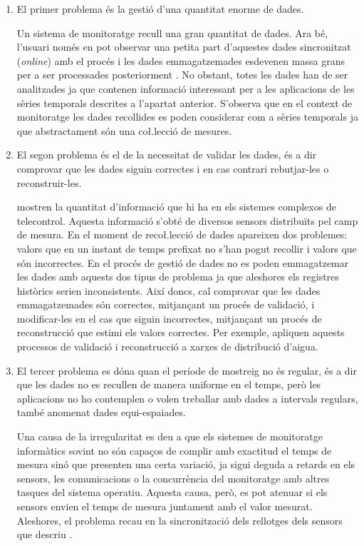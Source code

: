 \begin{enumerate}
\item El primer problema és la gestió d'una quantitat enorme de dades. 

Un sistema de monitoratge recull una gran quantitat de dades. Ara bé, l'usuari només en pot observar una petita part d'aquestes dades sincronitzat (\emph{online}) amb el procés i les dades emmagatzemades esdevenen massa grans per a ser processades posteriorment \parencite{keogh97}. No obstant, totes les dades han de ser analitzades ja que contenen informació interessant per a les aplicacions de les sèries temporals descrites a l'apartat anterior. S'observa que en el context de monitoratge les dades recollides es poden considerar com a sèries temporals ja que abstractament són una co\l.lecció de mesures.


\item El segon problema és el de la necessitat de validar les dades, és a dir comprovar que les dades siguin correctes i en cas contrari rebutjar-les o reconstruir-les. 

\textcite{quevedo10} mostren la quantitat d'informació que hi ha en els sistemes complexos de telecontrol. Aquesta informació s'obté de diversos sensors distribuïts pel camp de mesura.
En el moment de reco\l.lecció de dades apareixen dos problemes: valors que en un instant de temps prefixat no s'han pogut recollir i valors que són incorrectes. En el procés de gestió de dades no es poden emmagatzemar les dades amb aquests dos tipus de problema ja que aleshores els registres històrics serien inconsistents. 
Així doncs, cal comprovar que les dades emmagatzemades són correctes, mitjançant un procés de validació, i modificar-les en el cas que siguin incorrectes, mitjançant un procés de reconstrucció que estimi els valors correctes. Per exemple, \citeauthor{quevedo10} apliquen aquests processos de validació i reconstrucció a xarxes de distribució d'aigua.


\item El tercer problema es dóna quan el període de mostreig no és regular, és a dir que les dades no es recullen de manera uniforme en el temps, però les aplicacions no ho contemplen o volen treballar amb dades a intervals regulars, també anomenat dades equi-espaiades.

Una causa de la irregularitat es deu a que els sistemes de monitoratge informàtics sovint no són capaços de complir amb exactitud el temps de mesura sinó que presenten una certa variació, ja sigui deguda a retards en els sensors, les comunicacions o la concurrència del monitoratge amb altres tasques del sistema operatiu. Aquesta causa, però, es pot atenuar si els sensors envien el temps de mesura juntament amb el valor mesurat. Aleshores, el problema recau en la sincronització dels rellotges dels sensors que descriu \textcite[cap.~3]{kopetz11:realtime}.


\end{enumerate}
